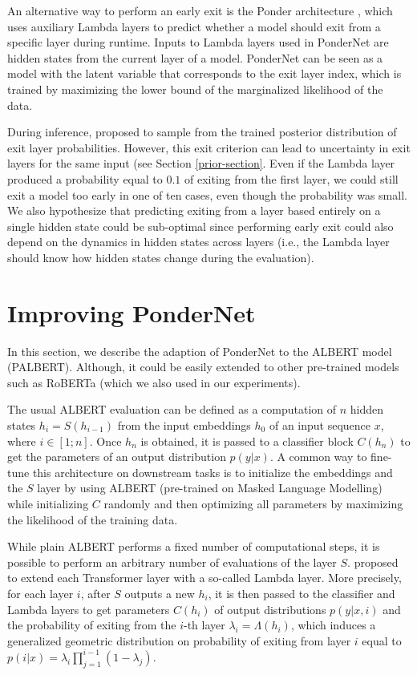 \documentclass{article}
\begin{document}
An alternative way to perform an early exit is the Ponder architecture \citep{pondernet}, which uses auxiliary Lambda layers to predict whether a model should exit from a specific layer during runtime. Inputs to Lambda layers used in PonderNet are hidden states from the current layer of a model. PonderNet can be seen as a model with the latent variable that corresponds to the exit layer index, which is trained by maximizing the lower bound of the marginalized likelihood of the data.

During inference, \citet{pondernet} proposed to sample from the trained posterior distribution of exit layer probabilities. However, this exit criterion can lead to uncertainty in exit layers for the same input (see Section \ref{prior-section}. Even if the Lambda layer produced a probability equal to $0.1$ of exiting from the first layer, we could still exit a model too early in one of ten cases, even though the probability was small. We also hypothesize that predicting exiting from a layer based entirely on a single hidden state could be sub-optimal since performing early exit could also depend on the dynamics in hidden states across layers (i.e., the Lambda layer should know how hidden states change during the evaluation).


\section{Improving PonderNet}
\label{palbert}
In this section, we describe the adaption of PonderNet to the ALBERT model (PALBERT). Although, it could be easily extended to other pre-trained models such as RoBERTa (which we also used in our experiments).


The usual ALBERT evaluation can be defined as a computation of $n$ hidden states $h_i = S(h_{i - 1})$ from the input embeddings $h_0$ of an input sequence $x$, where $i \in [1;n]$. Once $h_n$ is obtained, it is passed to a classifier block $C(h_n)$ to get the parameters of an output distribution $p(y|x)$. A common way to fine-tune this architecture on downstream tasks is to initialize the embeddings and the $S$ layer by using ALBERT (pre-trained on Masked Language Modelling) while initializing $C$ randomly and then optimizing all parameters by maximizing the likelihood of the training data.

While plain ALBERT performs a fixed number of computational steps, it is possible to perform an arbitrary number of evaluations of the layer $S$. \citet{pondernet} proposed to extend each Transformer layer with a so-called Lambda layer. More precisely, for each layer $i$, after $S$ outputs a new $h_i$, it is then passed to the classifier and Lambda layers to get parameters $C(h_i)$ of output distributions $p(y|x, i)$ and the probability of exiting from the $i$-th layer $\lambda_i = \Lambda(h_i)$, which induces a generalized geometric distribution on probability of exiting from layer $i$ equal to $p(i|x) = \lambda_i \prod_{j=1}^{i - 1}(1 - \lambda_j)$.
\end{document}
